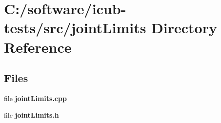 \section{C\+:/software/icub-\/tests/src/joint\+Limits Directory Reference}
\label{dir_52bb83cdfa78eea1d57abbea3c8e3d28}
\subsection*{Files}
\begin{DoxyCompactItemize}
\item 
file {\bfseries joint\+Limits.\+cpp}
\item 
file {\bfseries joint\+Limits.\+h}
\end{DoxyCompactItemize}
